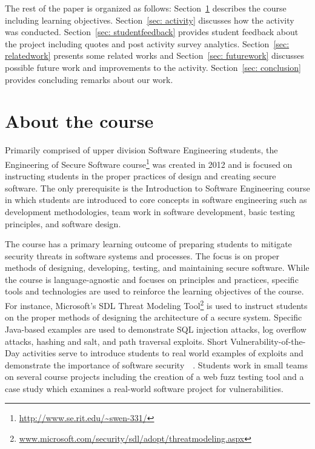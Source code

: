 \documentclass[conference]{IEEEtran}
\begin{document}
The rest of the paper is organized as follows: Section~\ref{sec: aboutcourse} describes the course including learning objectives. Section~\ref{sec: activity} discusses how the activity was conducted. Section~\ref{sec: studentfeedback} provides student feedback about the project including quotes and post activity survey analytics. Section~\ref{sec: relatedwork} presents some related works and Section~\ref{sec: futurework} discusses possible future work and improvements to the activity. Section~\ref{sec: conclusion} provides concluding remarks about our work.



\section{About the course}
\label{sec: aboutcourse}

Primarily comprised of upper division Software Engineering students, the Engineering of Secure Software
course\footnote{\url{http://www.se.rit.edu/~swen-331/}} was created in 2012 and is focused on instructing students in the proper practices of design and creating secure software. The only prerequisite is the Introduction to Software Engineering course in which students are introduced to core concepts in software engineering such as development methodologies, team work in software development, basic testing principles, and software design.

The course has a primary learning outcome of preparing students to mitigate security threats in software systems and processes. The focus is on proper methods of designing, developing, testing, and maintaining secure software. While the course is language-agnostic and focuses on principles and practices, specific tools and technologies are used to reinforce the learning objectives of the course. For instance, Microsoft's SDL Threat Modeling Tool\footnote{\url{www.microsoft.com/security/sdl/adopt/threatmodeling.aspx}} is used to instruct students on the proper methods of designing the architecture of a secure system. Specific Java-based examples are used to demonstrate SQL injection attacks, log overflow attacks, hashing and salt, and path traversal exploits. Short Vulnerability-of-the-Day activities serve to introduce students to real world examples of exploits and demonstrate the importance of software security~\ \cite{MeneelyICSESEE2013}. Students work in small teams on several course projects including the creation of a web fuzz testing tool and a case study which examines a real-world software project for vulnerabilities.
\end{document}
